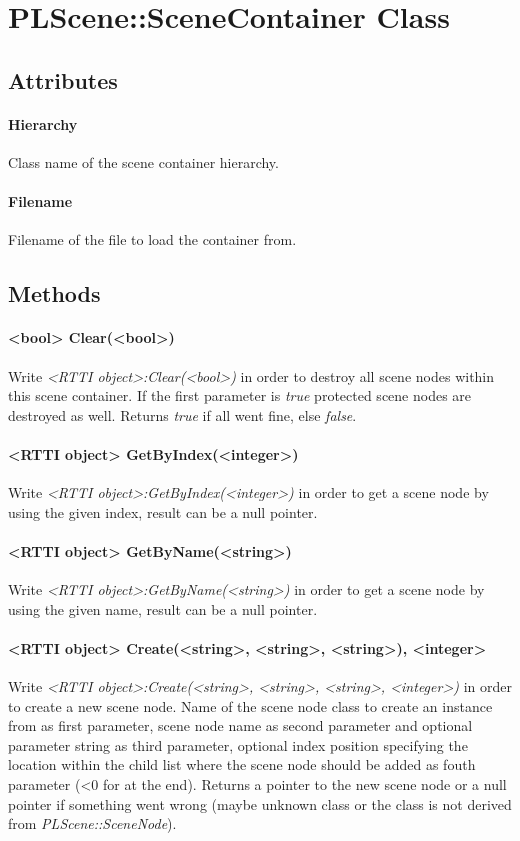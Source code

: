 \section{PLScene::SceneContainer Class}


\subsection{Attributes}

\paragraph{Hierarchy}
Class name of the scene container hierarchy.

\paragraph{Filename}
Filename of the file to load the container from.


\subsection{Methods}

\paragraph{<bool> Clear(<bool>)}
Write \emph{<RTTI object>:Clear(<bool>)} in order to destroy all scene nodes within this scene container. If the first parameter is \emph{true} protected scene nodes are destroyed as well. Returns \emph{true} if all went fine, else \emph{false}.

\paragraph{<RTTI object> GetByIndex(<integer>)}
Write \emph{<RTTI object>:GetByIndex(<integer>)} in order to get a scene node by using the given index, result can be a null pointer.

\paragraph{<RTTI object> GetByName(<string>)}
Write \emph{<RTTI object>:GetByName(<string>)} in order to get a scene node by using the given name, result can be a null pointer.

\paragraph{<RTTI object> Create(<string>, <string>, <string>), <integer>}
Write \emph{<RTTI object>:Create(<string>, <string>, <string>, <integer>)} in order to create a new scene node. Name of the scene node class to create an instance from as first parameter, scene node name as second parameter and optional parameter string as third parameter, optional index position specifying the location within the child list where the scene node should be added as fouth parameter (<0 for at the end). Returns a pointer to the new scene node or a null pointer if something went wrong (maybe unknown class or the class is not derived from \emph{PLScene::SceneNode}).

